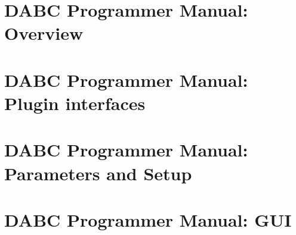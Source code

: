 
\chapter{DABC Programmer Manual: Overview}
 \cleardoublepage
\chapter{DABC Programmer Manual: Plugin interfaces}
 \cleardoublepage
\chapter{DABC Programmer Manual: Parameters and Setup}
 \cleardoublepage
\chapter{DABC Programmer Manual: GUI}
 \cleardoublepage

